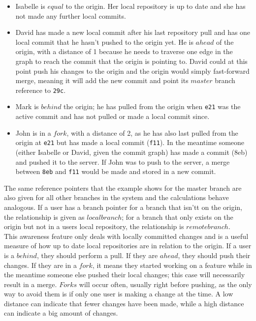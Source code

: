 \begin{itemize}


\item Isabelle is $equal$ to the origin. Her local repository is up to date and she has not made any further local commits.
\item David has made a new local commit after his last repository pull and has one local commit that he hasn't pushed to the origin yet. He is $ahead$ of the origin, with a distance of 1 because he needs to traverse one edge in the graph to reach the commit that the origin is pointing to. David could at this point push his changes to the origin and the origin would simply fast-forward merge, meaning it will add the new commit and point its $master$ branch reference to \texttt{29c}.
\item Mark is $behind$ the origin; he has pulled from the origin when \texttt{e21} was the active commit and has not pulled or made a local commit since.
\item John is in a $fork$, with a distance of 2, as he has also last pulled from the origin at \texttt{e21} but has made a local commit (\texttt{f11}). In the meantime someone (either Isabelle or David, given the commit graph) has made a commit (8eb) and pushed it to the server. If John was to push to the server, a merge between \texttt{8eb} and \texttt{f11} would be made and stored in a new commit.

\end{itemize}


The same reference pointers that the example shows for the master branch are also given for all other branches in the system and the calculations behave analogous. If a user has a branch pointer for a branch that isn'tt on the origin, the relationship is given as $local branch$; for a branch that only exists on the origin but not in a users local repository, the relationship is $remote branch$. \\

This awareness feature only deals with locally committed changes and is a useful measure of how up to date local repositories are in relation to the origin. If a user is a $behind$, they should perform a pull. If they are $ahead$, they should push their changes. If they are in a $fork$, it means they started working on a feature while in the meantime someone else pushed their local changes; this case will necessarily result in a merge. $Forks$ will occur often, usually right before pushing, as the only way to avoid them is if only one user is making a change at the time. A low distance can indicate that fewer changes have been made, while a high distance can indicate a big amount of changes. \\

